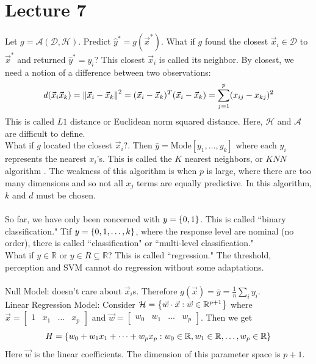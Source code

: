 \documentclass[12pt]{article}
\begin{document}
\section{Lecture 7} 
Let $g = \mathcal{A}(\mathcal{D},\mathcal{H})$. Predict $\hat{y}^* = g(\vec{x}^*)$. What if $g$ found the closest $\vec{x}_i \in \mathcal{D}$ to $\vec{x}^*$ and returned $\hat{y}^* = y_i$? This closest $\vec{x}_i$ is called its neighbor. By closest, we need a notion of a difference between two observations:  
$$d(\vec{x}_i \vec{x}_k) = \norm{\vec{x}_i - \vec{x}_k}^2 = (\vec{x}_i - \vec{x}_k)^T(\vec{x}_i - \vec{x}_k) = \sum_{j=1}^p (x_{ij} - x_{kj})^2 $$ 
This is called $L1$ distance or Euclidean norm squared distance. Here, $\mathcal{H}$ and $\mathcal{A}$ are difficult to define. \\
What if $g$ located the closest $\vec{x}_i$?. Then $\hat{y} = \text{Mode}[y_1, \dots, y_k]$ where each $y_i$ represents the nearest $x_i$'s. This is called the $K$ nearest neighbors, or $KNN$ algorithm . The weakness of this algorithm is when $p$ is large, where there are too many dimensions and so not all $x_j$ terms are equally predictive. In this algorithm, $k$ and $d$ must be chosen. \\~\\ 
So far, we have only been concerned with $y = \left\{ 0,1 \right\}$. This is called ``binary classification." Tif $y = \left\{ 0,1,\dots, k \right\}$, where the response level are nominal (no order), there is called ``classification" or ``multi-level classification." \\
What if $y \in \mathbb{R}$ or $y \in R \subseteq \mathbb{R}$? This is called ``regression." The threshold, perception and SVM cannot do regression without some adaptations. \\~\\
Null Model: doesn't care about $\vec{x}_i$s. Therefore $g(\vec{x}) = \overline{y} = \frac{1}{n} \sum_i y_i$. \\
Linear Regression Model: Consider $\mathcal{H} = \left\{  \vec{w} \cdot \vec{x}: \vec{w} \in \mathbb{R}^{p+1} \right\}$ where $\vec{x} = \begin{bmatrix} 1 & x_1 & \dots & x_p \end{bmatrix}$ and $\vec{w} = \begin{bmatrix} w_0 & w_1 & \dots & w_p \end{bmatrix}$. 
Then we get $$ H = \left\{ w_0 + w_1x_1 + \dots + w_px_p: w_0 \in \mathbb{R}, w_1 \in \mathbb{R}, \dots, w_p \in \mathbb{R} \right\}$$ Here $\vec{w}$ is the linear coefficients. The dimension of this parameter space is $p+1$. \\
\end{document}
